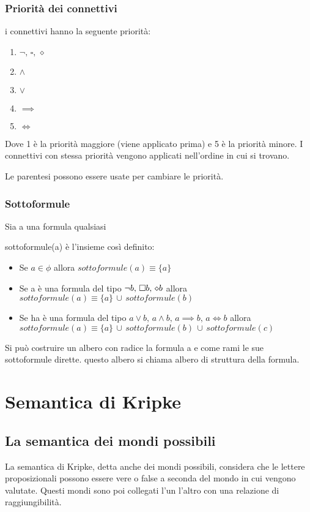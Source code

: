 \subsubsection*{Priorità dei connettivi}

i connettivi hanno la seguente priorità:
\begin{enumerate}
\item $\neg,\,\square,\,\diamond$
\item $\wedge$
\item $\vee$
\item $\implies$
\item $\iff$
\end{enumerate}
Dove 1 è la priorità maggiore (viene applicato prima) e 5 è la priorità
minore. I connettivi con stessa priorità vengono applicati nell'ordine
in cui si trovano.

Le parentesi possono essere usate per cambiare le priorità.


\subsubsection*{Sottoformule}

Sia a una formula qualsiasi

sottoformule(a) è l'insieme così definito:
\begin{itemize}
\item Se $a\in\phi$ allora $sottoformule(a)\equiv\{a\}$
\item Se a è una formula del tipo $\neg b,\,\square b,\,\diamond b$ allora $sottoformule(a)\equiv\{a\}\,\cup\, sottoformule(b)$
\item Se ha è una formula del tipo $a\vee b,\, a\wedge b,\, a\implies b,\, a\iff b$
allora $sottoformule(a)\equiv\{a\}\,\cup\, sottoformule(b)\,\cup\, sottoformule(c)$
\end{itemize}
Si può costruire un albero con radice la formula a e come rami le
sue sottoformule dirette. questo albero si chiama albero di struttura
della formula.


\section{Semantica di Kripke}


\subsection{La semantica dei mondi possibili}

La semantica di Kripke, detta anche dei mondi possibili, considera
che le lettere proposizionali possono essere vere o false a seconda
del mondo in cui vengono valutate. Questi mondi sono poi collegati
l'un l'altro con una relazione di raggiungibilità.

